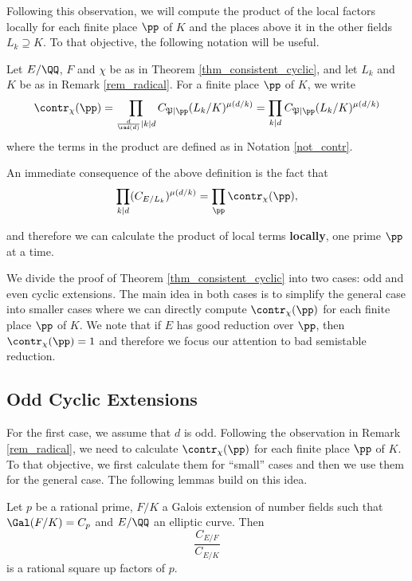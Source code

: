 Following this observation, we will compute the product of the local factors locally for each finite place $\pp$ of $K$ and the places above it in the other fields $L_k\supseteq K$. To that objective, the following notation will be useful.

\begin{notation}\label{not_local_contr}
    Let $E/\QQ$, $F$ and $\chi$ be as in Theorem \ref*{thm_consistent_cyclic}, and let $L_k$ and $K$ be as in Remark \ref*{rem_radical}. For a finite place $\pp$ of $K$, we write
    $$\contr_\chi(\pp)=\prod_{\frac{d}{\rad(d)}\mid k\mid d}C_{\mathfrak{P}\mid\pp}(L_k/K)^{\mu(d/k)}=\prod_{k\mid d}C_{\mathfrak{P}\mid\pp}(L_k/K)^{\mu(d/k)}$$ 
    where the terms in the product are defined as in Notation \ref*{not_contr}. 
\end{notation}

An immediate consequence of the above definition is the fact that 
\begin{equation}\label{eqn_local_contr}
    \prod_{k\mid d}(C_{E/L_k})^{\mu(d/k)}=\prod_\pp\contr_\chi(\pp),
\end{equation}

and therefore we can calculate the product of local terms \textbf{locally}, one prime $\pp$ at a time.

We divide the proof of Theorem \ref*{thm_consistent_cyclic} into two cases: odd and even cyclic extensions. The main idea in both cases is to simplify the general case into smaller cases where we can directly compute $\contr_\chi(\pp)$ for each finite place $\pp$ of $K$. We note that if $E$ has good reduction over $\pp$, then $\contr_\chi(\pp)=1$ and therefore we focus our attention to bad semistable reduction. 

\subsection*{Odd Cyclic Extensions} \label{case_Cp}

For the first case, we assume that $d$ is odd. Following the observation in Remark \ref*{rem_radical}, we need to calculate $\contr_\chi(\pp)$ for each finite place $\pp$ of $K$. To that objective, we first calculate them for ``small'' cases and then we use them for the general case. The following lemmas build on this idea.

\begin{lemma}\label{lem_Cp}
    Let $p$ be a rational prime, $F/K$ a Galois extension of number fields such that $\Gal(F/K)=C_p$ and $E/\QQ$ an elliptic curve. Then 
    $$\frac{C_{E/F}}{C_{E/K}}$$
    is a rational square up factors of $p$.
\end{lemma}

